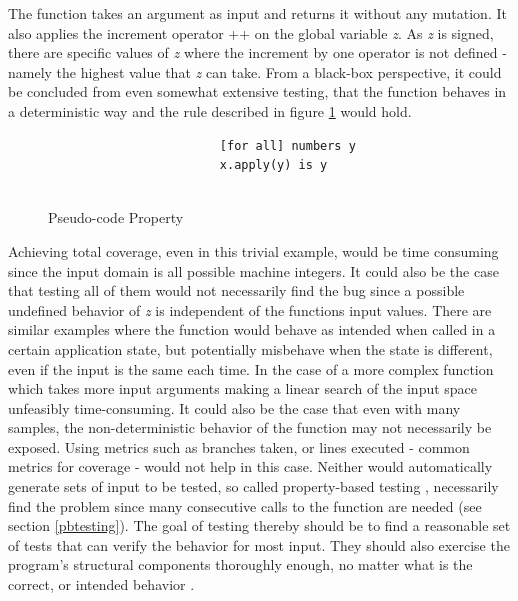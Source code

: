 The function takes an argument as input and returns it without any mutation. It also applies the increment operator ++ on the global variable \textit{z}. As \textit{z} is signed, there are specific values of \textit{z} where the increment by one operator is not defined - namely the highest value that \textit{z} can take. From a black-box perspective, it could be concluded from even somewhat extensive testing, that the function behaves in a deterministic way and the rule described in figure \ref{fig:pseudoproperty} would hold.
\begin{figure}[H]
 \vspace{12pt}
\begin{verbatim}
                        [for all] numbers y     
                        x.apply(y) is y
                        
\end{verbatim}
    \caption{Pseudo-code Property}
    \label{fig:pseudoproperty}
\end{figure}

Achieving total coverage, even in this trivial example, would be time consuming since the input domain is all possible machine integers. It could also be the case that testing all of them would not necessarily find the bug since a possible undefined behavior of \textit{z} is independent of the functions input values. There are similar examples where the function would behave as intended when called in a certain application state, but potentially misbehave when the state is different, even if the input is the same each time. In the case of a more complex function which takes more input arguments making a linear search of the input space unfeasibly time-consuming. It could also be the case that even with many samples, the non-deterministic behavior of the function may not necessarily be exposed. Using metrics such as branches taken, or lines executed \cite{comparison} - common metrics for coverage - would not help in this case. 
Neither would automatically generate sets of input to be tested, so called property-based testing \cite{duregard_automating_2016}, necessarily find the problem since many consecutive calls to the function are needed (see section \ref{pbtesting}). The goal of testing thereby should be to find a reasonable set of tests that can verify the behavior for most input. They should also exercise the program's structural components thoroughly enough, no matter what is the correct, or intended behavior \cite{comparison}. 

